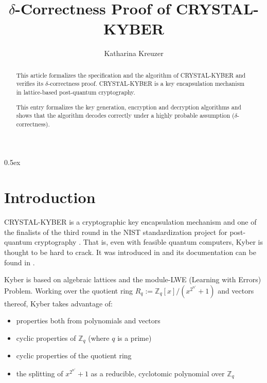 \documentclass[11pt,a4paper]{article}
\begin{document}
\title{$\delta$-Correctness Proof of CRYSTAL-KYBER}
\author{Katharina Kreuzer}
\maketitle

\begin{abstract}
This article formalizes the specification and the algorithm of CRYSTAL-KYBER and verifies its $\delta$-correctness proof. 
CRYSTAL-KYBER is a key encapsulation mechanism in lattice-based post-quantum cryptography. 

This entry formalizes the key generation, encryption and decryption algorithms and shows that the algorithm decodes correctly under a highly probable assumption ($\delta$-correctness).
\end{abstract}


\newpage
\tableofcontents

\newpage
\parindent 0pt\parskip 0.5ex

\section{Introduction}
CRYSTAL-KYBER is a cryptographic key encapsulation mechanism and one of the finalists of the third round in the NIST standardization project for post-quantum cryptography \cite{report3rdroundNIST}. That is, even with feasible quantum computers, Kyber is thought to be hard to crack. It was introduced in \cite{kyber} and its documentation can be found in \cite{KyberAS}.

Kyber is based on algebraic lattices and the module-LWE (Learning with Errors) Problem. 
Working over the quotient ring $R_q := \mathbb{Z}_q[x]/(x^{2^{n'}}+1)$ and vectors thereof, Kyber takes advantage of:
\begin{itemize}
\item properties both from polynomials and vectors
\item cyclic properties of $\mathbb{Z}_q$ (where $q$ is a prime) 
\item cyclic properties of the quotient ring
\item the splitting of $x^{2^{n'}}+1$ as a reducible, cyclotomic polynomial over $\mathbb{Z}_q$
\end{itemize}
\end{document}
